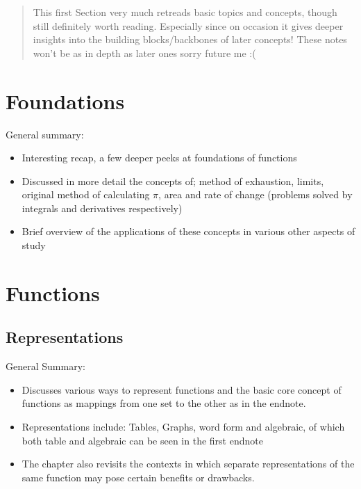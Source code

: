 \setcounter{section}{-1}

\begin{abstract}
    This first Section very much retreads basic topics and concepts, though still definitely worth reading. Especially since on occasion it gives deeper insights into the building blocks/backbones of later concepts! These notes won't be as in depth as later ones sorry future me :(
\end{abstract}

\section{Foundations}
General summary:
\begin{itemize}
    \item Interesting recap, a few deeper peeks at foundations of functions
    \item Discussed in more detail the concepts of; method of exhaustion, limits, original method of calculating \(\pi\), area and rate of change (problems solved by integrals and derivatives respectively)
    \item Brief overview of the applications of these concepts in various other aspects of study
\end{itemize}

\section{Functions}
\subsection{Representations}
General Summary:
\begin{itemize}
    \item Discusses various ways to represent functions and the basic core concept of functions as mappings from one set to the other as in the endnote. 
    \item Representations include: Tables, Graphs, word form and algebraic, of which both table and algebraic can be seen in the first endnote
    \item The chapter also revisits the contexts in which separate representations of the same function may pose certain benefits or drawbacks.
\end{itemize}
